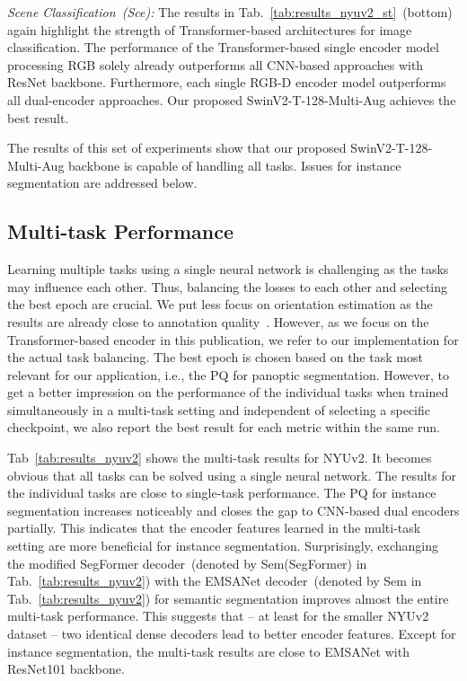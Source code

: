 \documentclass[conference]{IEEEtran}
\begin{document}
\textit{Scene Classification~(Sce):} \enspace The results in Tab.~\ref{tab:results_nyuv2_st}~(bottom) again highlight the strength of Transformer-based 
architectures for image classification.
The performance of the Transformer-based single encoder model processing RGB solely already outperforms all CNN-based approaches with ResNet backbone.
Furthermore, each single RGB-D encoder model outperforms all dual-encoder approaches.
Our proposed SwinV2-T-128-Multi-Aug achieves the best result.

The results of this set of experiments show that our proposed SwinV2-T-128-Multi-Aug backbone is capable of handling all tasks.
Issues for instance segmentation are addressed below.

\subsection{Multi-task Performance}
\label{sec:experiments:multi}
Learning multiple tasks using a single neural network is challenging as the tasks may influence each other. 
Thus, balancing the losses to each other and selecting the best epoch are crucial.
We put less focus on orientation estimation as the results are already close to annotation quality~\cite{emsanet2022ijcnn}.
However, as we focus on the Transformer-based encoder in this publication, we refer to our implementation for the actual task balancing.
The best epoch is chosen based on the task most relevant for our application, i.e., the PQ for panoptic segmentation.
However, to get a better impression on the performance of the individual tasks when trained simultaneously in a multi-task setting and independent of selecting a specific checkpoint, we also report the best result for each metric within the same run.


Tab~\ref{tab:results_nyuv2} shows the multi-task results for NYUv2.
It becomes obvious that all tasks can be solved using a single neural network. 
The results for the individual tasks are close to single-task performance.
The PQ for instance segmentation increases noticeably and closes the gap to CNN-based dual encoders partially. 
This indicates that the encoder features learned in the multi-task setting are more beneficial for instance segmentation. 
Surprisingly, exchanging the modified SegFormer decoder~(denoted by Sem(SegFormer) in Tab.~\ref{tab:results_nyuv2}) with the EMSANet decoder~(denoted by Sem in Tab.~\ref{tab:results_nyuv2}) for semantic segmentation improves almost the entire multi-task performance.
This suggests that -- at least for the smaller NYUv2 dataset -- two identical dense decoders lead to better encoder features.
Except for instance segmentation, the multi-task results are close to EMSANet with ResNet101 backbone.
\end{document}
